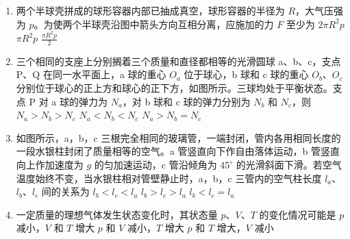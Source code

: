 \documentclass[\gkver]{gaokaozhenti}
\begin{document}
\begin{enumerate}
\item
两个半球壳拼成的球形容器内部已抽成真空，球形容器的半径为 $R$，大气压强为 $p$。为使两个半球壳沿图中箭头方向互相分离，应施加的力 $F$ 至少为
\onepicture[w=4.53cm]{}
{$2\pi R^{2}p$}
{$\pi R^{2}p$}
{$\frac{\pi R^{2}p}{2}$}

\item
三个相同的支座上分别搁着三个质量和直径都相等的光滑圆球 a、b、c，支点 P、Q 在同一水平面上，a 球的重心 $O_{a}$ 位于球心，b 球和 c 球的重心 $O_{b}$、$O_{c}$ 分别位于球心的正上方和球心的正下方，如图所示。三球均处于平衡状态。支点 P 对 a 球的弹力为 $N_{a}$，对 b 球和 c 球的弹力分别为 $N_{b}$ 和 $N_{c}$，则
\onepicture[w=10.00cm]{}
{$N_{a} > N_{b} > N_{c}$}
{$N_{a} < N_{b} < N_{c}$}
{$N_{a} > N_{b} = N_{c}$}

\item
如图所示，a，b，c 三根完全相同的玻璃管，一端封闭，管内各用相同长度的一段水银柱封闭了质量相等的空气。a 管竖直向下作自由落体运动，b 管竖直向上作加速度为 $g$ 的匀加速运动，c 管沿倾角为 $45^{\circ}$ 的光滑斜面下滑。若空气温度始终不变，当水银柱相对管壁静止时，a，b，c 三管内的空气柱长度 $l_{a}$、$l_{b}$、$l_{c}$ 间的关系为
\onepicture[w=7.00cm]{}
{$l_{b} < l_{c} < l_{a}$}
{$l_{b} > l_{c} > l_{a}$}
{$l_{b} < l_{c} = l_{a}$}

\item
一定质量的理想气体发生状态变化时，其状态量 $p$、$V$、$T$ 的变化情况可能是
{$p$ 减小，$V$ 和 $T$ 增大}
{$p$ 和 $V$ 减小，$T$ 增大}
{$p$ 和 $T$ 增大，$V$ 减小}


\end{enumerate}
\end{document}

